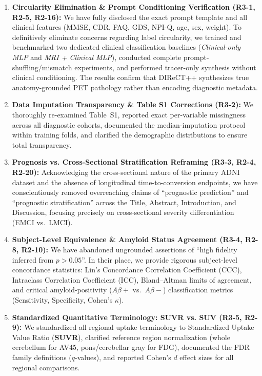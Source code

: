 \begin{enumerate}[leftmargin=1.5em, itemsep=4pt]
  \item \textbf{Circularity Elimination \& Prompt Conditioning Verification (R3-1, R2-5, R2-16):}
  We have fully disclosed the exact prompt template and all clinical features (MMSE, CDR, FAQ, GDS, NPI-Q, age, sex, weight). To definitively eliminate concerns regarding label circularity, we trained and benchmarked two dedicated clinical classification baselines (\emph{Clinical-only MLP} and \emph{MRI + Clinical MLP}), conducted complete prompt-shuffling/mismatch experiments, and performed tracer-only synthesis without clinical conditioning. The results confirm that DIReCT++ synthesizes true anatomy-grounded PET pathology rather than encoding diagnostic metadata.

  \item \textbf{Data Imputation Transparency \& Table S1 Corrections (R3-2):}
  We thoroughly re-examined Table~S1, reported exact per-variable missingness across all diagnostic cohorts, documented the median-imputation protocol within training folds, and clarified the demographic distributions to ensure total transparency.

  \item \textbf{Prognosis vs. Cross-Sectional Stratification Reframing (R3-3, R2-4, R2-20):}
  Acknowledging the cross-sectional nature of the primary ADNI dataset and the absence of longitudinal time-to-conversion endpoints, we have conscientiously removed overreaching claims of ``prognostic prediction'' and ``prognostic stratification'' across the Title, Abstract, Introduction, and Discussion, focusing precisely on cross-sectional severity differentiation (EMCI vs.\ LMCI).

  \item \textbf{Subject-Level Equivalence \& Amyloid Status Agreement (R3-4, R2-8, R2-10):}
  We have abandoned ungrounded assertions of ``high fidelity inferred from $p > 0.05$''. In their place, we provide rigorous subject-level concordance statistics: Lin's Concordance Correlation Coefficient (CCC), Intraclass Correlation Coefficient (ICC), Bland--Altman limits of agreement, and critical amyloid-positivity ($A\beta+$ vs.\ $A\beta-$) classification metrics (Sensitivity, Specificity, Cohen's $\kappa$).

  \item \textbf{Standardized Quantitative Terminology: SUVR vs. SUV (R3-5, R2-9):}
  We standardized all regional uptake terminology to Standardized Uptake Value Ratio (\textbf{SUVR}), clarified reference region normalization (whole cerebellum for AV45, pons/cerebellar gray for FDG), documented the FDR family definitions ($q$-values), and reported Cohen's $d$ effect sizes for all regional comparisons.


\end{enumerate}
